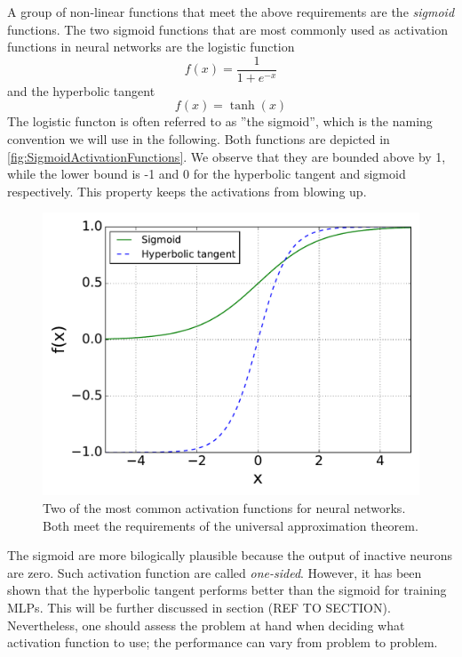 \documentclass[twoside,english]{uiofysmaster}
\begin{document}
A group of non-linear functions that meet the above requirements are the \textit{sigmoid} functions. 
The two sigmoid functions that are most commonly used as activation functions \cite{Rojas96} in 
neural networks are the logistic function
\begin{equation}
 f(x) = \frac{1}{1 + e^{-x}}
 \label{sigmoidActivationFunction}
\end{equation}
and the hyperbolic tangent
\begin{equation}
 f(x) = \tanh(x)
 \label{tanhActivationFunction}
\end{equation}
The logistic functon is often referred to as ''the sigmoid'', which is the naming convention we will use 
in the following. Both functions are depicted in \autoref{fig:SigmoidActivationFunctions}. We observe that they
are bounded above by 1, while the lower bound is -1 and 0 for the hyperbolic tangent and sigmoid respectively. This property 
keeps the activations from blowing up. 
\begin{figure}
\begin{center}
  \includegraphics[width = 0.7\linewidth]{Figures/Theory/activationFunctions.pdf}
  \caption{Two of the most common activation functions for neural networks. Both meet the requirements
	   of the universal approximation theorem.}
  \label{fig:SigmoidActivationFunctions}
  \end{center}
\end{figure}
The sigmoid are more bilogically plausible because 
the output of inactive neurons are zero. Such activation function are called \textit{one-sided}. However,
it has been shown \cite{Karlik11} that the hyperbolic tangent 
performs better than the sigmoid for training MLPs. This will be further discussed in section (REF TO SECTION). 
Nevertheless, one should assess the problem 
at hand when deciding what activation function to use; the performance can vary from problem to problem. 
\end{document}

